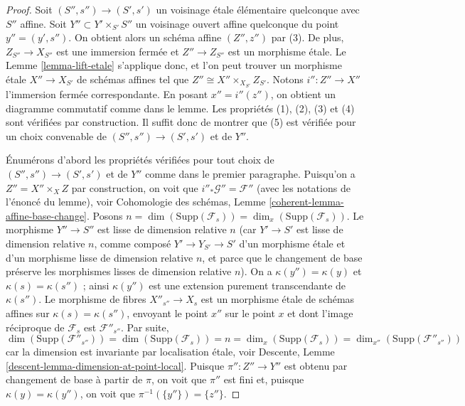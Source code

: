 \begin{proof}
Soit $(S'', s'') \to (S', s')$ un voisinage \'etale élémentaire quelconque
avec $S''$ affine. Soit $Y'' \subset Y' \times_{S'} S''$ un voisinage
ouvert affine quelconque du point $y'' = (y', s'')$. On
obtient alors un schéma affine $(Z'', z'')$ par (3). De plus, $Z_{S''} \to X_{S''}$
est une immersion fermée et $Z'' \to Z_{S''}$ est un morphisme \'etale.
Le
Lemme \ref{lemma-lift-etale}
s'applique donc, et l'on peut trouver un morphisme \'etale $X'' \to X_{S'}$ de schémas affines
tel que $Z'' \cong X'' \times_{X_{S'}} Z_{S'}$. Notons $i'' : Z'' \to X''$
l'immersion fermée correspondante. En posant $x'' = i''(z'')$, on obtient un
diagramme commutatif comme dans le lemme.
Les propriétés (1), (2), (3) et (4) sont vérifiées par construction.
Il suffit donc de montrer que (5) est vérifiée pour un choix convenable de
$(S'', s'') \to (S', s')$ et de $Y''$.

\medskip\noindent
Énumérons d'abord les propriétés vérifiées pour tout choix de
$(S'', s'') \to (S', s')$ et de $Y''$ comme dans le premier paragraphe.
Puisqu'on a $Z'' = X'' \times_X Z$ par construction, on voit que
$i''_*\mathcal{G}'' = \mathcal{F}''$ (avec les notations de
l'énoncé du lemme), voir
Cohomologie des schémas, Lemme \ref{coherent-lemma-affine-base-change}.
Posons $n = \dim(\text{Supp}(\mathcal{F}_s)) = \dim_x(\text{Supp}(\mathcal{F}_s))$.
Le morphisme $Y'' \to S''$ est lisse de dimension relative $n$
(car $Y' \to S'$ est lisse de dimension relative $n$,
comme composé $Y' \to Y_{S'} \to S'$ d'un morphisme \'etale et
d'un morphisme lisse de dimension relative $n$, et parce que le changement de base
préserve les morphismes lisses de dimension relative $n$).
On a $\kappa(y'') = \kappa(y)$ et $\kappa(s) = \kappa(s'')$ ;
ainsi $\kappa(y'')$ est une extension purement transcendante de $\kappa(s'')$.
Le morphisme de fibres $X''_{s''} \to X_s$ est un morphisme \'etale de schémas
affines sur $\kappa(s) = \kappa(s'')$, envoyant le point $x''$ sur le
point $x$ et dont l'image réciproque de $\mathcal{F}_s$ est $\mathcal{F}''_{s''}$.
Par suite,
$$
\dim(\text{Supp}(\mathcal{F}''_{s''})) =
\dim(\text{Supp}(\mathcal{F}_s)) = n =
\dim_x(\text{Supp}(\mathcal{F}_s)) =
\dim_{x''}(\text{Supp}(\mathcal{F}''_{s''}))
$$
car la dimension est invariante par localisation \'etale, voir
Descente, Lemme \ref{descent-lemma-dimension-at-point-local}.
Puisque $\pi'' : Z'' \to Y''$ est obtenu par changement de base à partir de $\pi$, on voit que
$\pi''$ est fini et, puisque $\kappa(y) = \kappa(y'')$, on voit que
$\pi^{-1}(\{y''\}) = \{z''\}$.


\end{proof}
